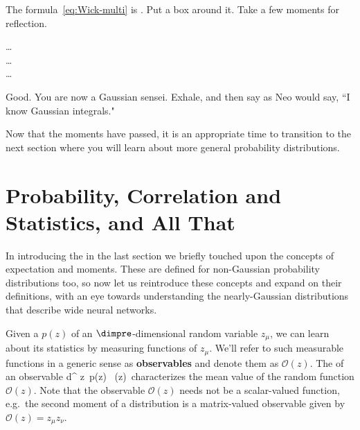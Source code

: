 The formula~\eqref{eq:Wick-multi} is . Put a box around it.
Take a few moments for reflection. 

\begin{center}
\ldots\\

\ldots\\

\ldots\\
\end{center}

\noindent Good.
You are now a Gaussian sensei. %
Exhale, and then say as Neo would say,
``I know Gaussian integrals." 

Now that the moments have passed, it is an appropriate time to transition to the next section where you will learn about more general probability distributions.


\section{Probability, Correlation and Statistics, and All That}\label{sec:not-Gauss}






In introducing the  in the last section we briefly touched upon the concepts of 
expectation and moments.
These are defined for non-Gaussian
probability distributions too, so now let us reintroduce these concepts and expand on their definitions, with an eye towards understanding the nearly-Gaussian distributions that describe wide neural networks. %











Given a  $p(z)$ of an $\dimpre$-dimensional random variable $z_\mu$, we can learn about its statistics by measuring functions of $z_{\mu}$. We'll refer to such measurable functions in a generic sense as \textbf{observables} and denote them as $\mathcal{O}(z)$. The  of an observable
\be\label{eq:expectation-value-definition}
\equiv \int d^\dimpre\! z\ p(z) \, (z)\, %
\ee
characterizes the 
mean value of the random function $\mathcal{O}(z)$. %
Note that the observable $\mathcal{O}(z)$ needs not be a scalar-valued function, e.g.~the second moment of a distribution is a matrix-valued observable given by $\mathcal{O}(z) = z_\mu z_\nu$.

